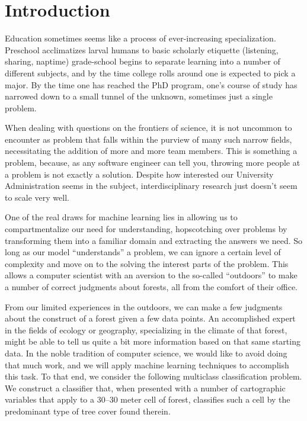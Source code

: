\section{Introduction}
\label{sec:-intro}

Education sometimes seems like a process of ever-increasing 
specialization. Preschool acclimatizes larval humans to basic
scholarly etiquette (listening, sharing, naptime) grade-school begins 
to separate learning into a number of different subjects, and by the 
time college rolls around one is expected to pick a major.  By the time 
one has reached the PhD program, one's course of study has narrowed 
down to a small tunnel of the unknown, sometimes just a single problem.

When dealing with questions on the frontiers of science, it is not 
uncommon to encounter as problem that falls within the purview of many
such narrow fields, necessitating the addition of more and more team 
members.  This is something a problem, because, as any software engineer 
can tell you\cite{mythical}, throwing more people at a problem is not 
exactly a solution.  Despite how interested our University 
Administration seems in the subject, interdisciplinary research 
just doesn't seem to scale very well.

One of the real draws for machine learning lies in allowing us to 
compartmentalize our need for understanding, hopscotching over 
problems by transforming them into a familiar domain and extracting 
the answers we need.  So long as our model ``understands'' a problem, 
we can ignore a certain level of complexity and move on to the 
solving the interest parts of the problem.  This allows a computer 
scientist with an aversion to the so-called ``outdoors'' to make a 
number of correct judgments about forests, all from the comfort of 
their office.

From our limited experiences in the outdoors, we can make a few judgments about
the construct of a forest given a few data points. An accomplished expert 
in the fields of ecology or geography, specializing in the climate of 
that forest, might be able to tell us quite a bit more information based 
on that same starting data.  In the noble tradition of computer science, we 
would like to avoid doing that much work, and we will apply machine 
learning techniques to accomplish this task.  To that end, we consider 
the following multiclass classification problem. We construct a 
classifier that, when presented with a number of cartographic variables 
that apply to a 30--30 meter cell of forest, classifies such a cell by 
the predominant type of tree cover found therein.

